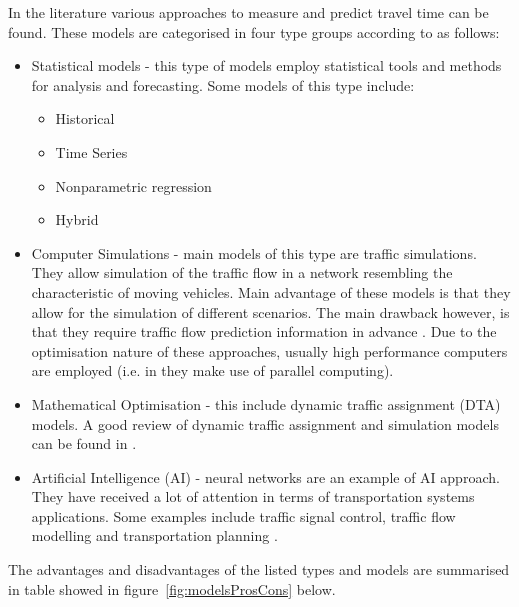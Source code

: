 In the literature various approaches to measure and predict travel time can be found. These models are categorised in four type groups according to \cite{youKim} as follows:
\begin{itemize}
	\item Statistical models - this type of models employ statistical tools and methods for analysis and forecasting. Some models of this type include:
	\begin{itemize}
		\item Historical
		\item Time Series
		\item Nonparametric regression
		\item Hybrid
	\end{itemize}
	
	\item Computer Simulations - main models of this type are traffic simulations. They allow simulation of the traffic flow in a network resembling the characteristic of moving vehicles. Main advantage of these models is that they allow for the simulation of different scenarios. The main drawback however, is that they require traffic flow prediction information in advance \cite{smith1997traffic}. Due to the optimisation nature of these approaches, usually high performance computers are employed (i.e. in \cite{junchaya1992advanced} they make use of parallel computing).
	
	\item Mathematical Optimisation - this include dynamic traffic assignment (DTA) models. A good review of dynamic traffic assignment and simulation models can be found in \cite{mahmassani1991review}.

	\item Artificial Intelligence (AI) - neural networks are an example of AI approach. They have received a lot of attention in terms of transportation systems applications. Some examples include traffic signal control, traffic flow modelling and transportation planning \cite{gilmore1995neural,Dougherty199721,smith1997traffic}.
\end{itemize}
The advantages and disadvantages of the listed types and models are summarised in table showed in figure~\ref{fig:modelsProsCons} below.

